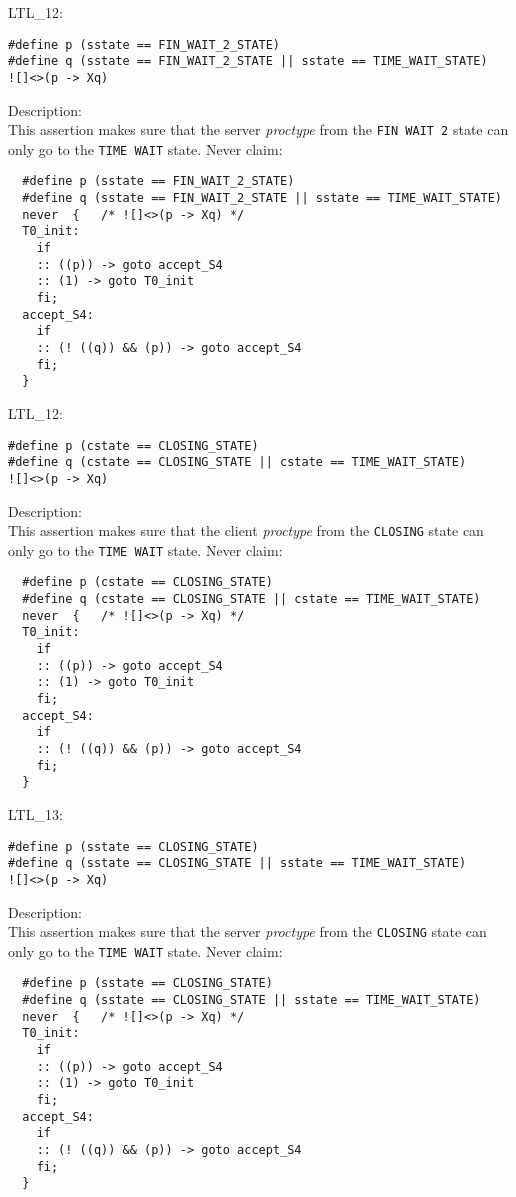 \documentclass{WigReport}
\begin{document}
LTL\_12:\\
\begin{lstlisting}
#define p (sstate == FIN_WAIT_2_STATE)
#define q (sstate == FIN_WAIT_2_STATE || sstate == TIME_WAIT_STATE)
![]<>(p -> Xq)
\end{lstlisting}
Description:\\
This assertion makes sure that the server \textit{proctype} from the \verb|FIN WAIT 2| state can only go to the \verb|TIME WAIT| state.
Never claim:\\
\begin{lstlisting}
  #define p (sstate == FIN_WAIT_2_STATE)
  #define q (sstate == FIN_WAIT_2_STATE || sstate == TIME_WAIT_STATE)
  never  {   /* ![]<>(p -> Xq) */
  T0_init:
    if
    :: ((p)) -> goto accept_S4
    :: (1) -> goto T0_init
    fi;
  accept_S4:
    if
    :: (! ((q)) && (p)) -> goto accept_S4
    fi;
  }
\end{lstlisting}


LTL\_12:\\
\begin{lstlisting}
#define p (cstate == CLOSING_STATE)
#define q (cstate == CLOSING_STATE || cstate == TIME_WAIT_STATE)
![]<>(p -> Xq)
\end{lstlisting}
Description:\\
This assertion makes sure that the client \textit{proctype} from the \verb|CLOSING| state can only go to the \verb|TIME WAIT| state.
Never claim:\\
\begin{lstlisting}
  #define p (cstate == CLOSING_STATE)
  #define q (cstate == CLOSING_STATE || cstate == TIME_WAIT_STATE)
  never  {   /* ![]<>(p -> Xq) */
  T0_init:
    if
    :: ((p)) -> goto accept_S4
    :: (1) -> goto T0_init
    fi;
  accept_S4:
    if
    :: (! ((q)) && (p)) -> goto accept_S4
    fi;
  }
\end{lstlisting}


LTL\_13:\\
\begin{lstlisting}
#define p (sstate == CLOSING_STATE)
#define q (sstate == CLOSING_STATE || sstate == TIME_WAIT_STATE)
![]<>(p -> Xq)
\end{lstlisting}
Description:\\
This assertion makes sure that the server \textit{proctype} from the \verb|CLOSING| state can only go to the \verb|TIME WAIT| state.
Never claim:\\
\begin{lstlisting}
  #define p (sstate == CLOSING_STATE)
  #define q (sstate == CLOSING_STATE || sstate == TIME_WAIT_STATE)
  never  {   /* ![]<>(p -> Xq) */
  T0_init:
    if
    :: ((p)) -> goto accept_S4
    :: (1) -> goto T0_init
    fi;
  accept_S4:
    if
    :: (! ((q)) && (p)) -> goto accept_S4
    fi;
  }
\end{lstlisting}
\end{document}
